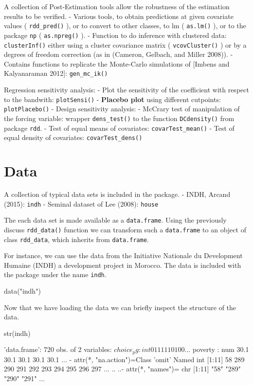 \documentclass[article]{jss}
\begin{document}
A collection of Post-Estimation tools allow the robustness of the
estimation results to be verified. - Various tools, to obtain
predictions at given covariate values ( \texttt{rdd\_pred()} ), or to
convert to other classes, to lm ( \texttt{as.lm()} ), or to the package
\texttt{np} ( \texttt{as.npreg()} ). - Function to do inference with
clustered data: \texttt{clusterInf()} either using a cluster covariance
matrix ( \texttt{vcovCluster()} ) or by a degrees of freedom correction
(as in (Cameron, Gelbach, and Miller 2008)). - Contains functions to
replicate the Monte-Carlo simulations of {[}Imbens and Kalyanaraman
2012{]}: \texttt{gen\_mc\_ik()}

Regression sensitivity analysis: - Plot the sensitivity of the
coefficient with respect to the bandwith: \texttt{plotSensi()} -
\textbf{Placebo plot} using different cutpoints: \texttt{plotPlacebo()}
- Design sensitivity analysis: - McCrary test of manipulation of the
forcing variable: wrapper \texttt{dens\_test()} to the function
\texttt{DCdensity()} from package \texttt{rdd}. - Test of equal means of
covariates: \texttt{covarTest\_mean()} - Test of equal density of
covariates: \texttt{covarTest\_dens()}

\section{Data}\label{data}

A collection of typical data sets is included in the package. - INDH,
Arcand (2015): \texttt{indh} - Seminal dataset of Lee (2008):
\texttt{house}

The each data set is made available as a \texttt{data.frame}. Using the
previously discuss \texttt{rdd\_data()} function we can transform such a
\texttt{data.frame} to an object of class \texttt{rdd\_data}, which
inherits from \texttt{data.frame}.

For instance, we can use the data from the Initiative Nationale du
Development Humaine (INDH) a development project in Morocco. The data is
included with the package under the name \texttt{indh}.

\begin{CodeChunk}
\begin{CodeInput}
data("indh")
\end{CodeInput}
\end{CodeChunk}

Now that we have loading the data we can briefly inspect the structure
of the data.

\begin{CodeChunk}
\begin{CodeInput}
str(indh)
\end{CodeInput}
\begin{CodeOutput}
'data.frame':   720 obs. of  2 variables:
 $ choice_pg: int  0 1 1 1 1 1 0 1 0 0 ...
 $ poverty  : num  30.1 30.1 30.1 30.1 30.1 ...
 - attr(*, "na.action")=Class 'omit'  Named int [1:11] 58 289 290 291 292 293 294 295 296 297 ...
  .. ..- attr(*, "names")= chr [1:11] "58" "289" "290" "291" ...
\end{CodeOutput}
\end{CodeChunk}
\end{document}
